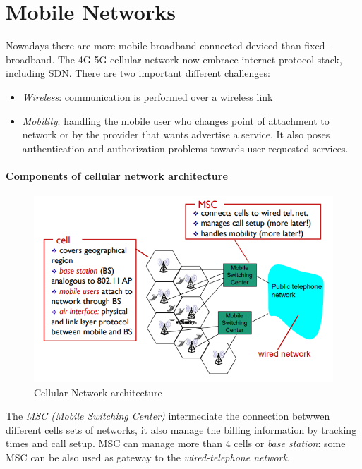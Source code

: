 \documentclass[10pt,a4paper]{report}
\theoremstyle{definition}
\begin{document}
\section{Mobile Networks}\label{sec:mobile-networks}
Nowadays there are more mobile-broadband-connected deviced than fixed-broadband. The 4G-5G cellular network now embrace internet protocol stack, including SDN.
There are two important different challenges:
\begin{itemize}
	\item 
	\textit{Wireless}: communication is performed over a wireless link
	\item 
	\textit{Mobility}: handling the mobile user who changes point of attachment to network or by the provider that wants advertise a service. It also poses authentication and authorization problems towards user requested services.
\end{itemize}
\paragraph{Components of cellular network architecture}\label{sec:components-of-cellular-network-architecture}
\begin{figure}[h!]
	\centering\includegraphics[scale=0.50]{images/Pasted image 20230301172546.png}
	\caption{Cellular Network architecture}
\end{figure}

The \textit{MSC (Mobile Switching Center)} intermediate the connection betwwen different cells sets of networks, it also manage the billing information by tracking times and call setup.
MSC can manage more than 4 cells or \textit{base station}: some MSC can be also used as gateway to the \textit{wired-telephone network}.
\end{document}
